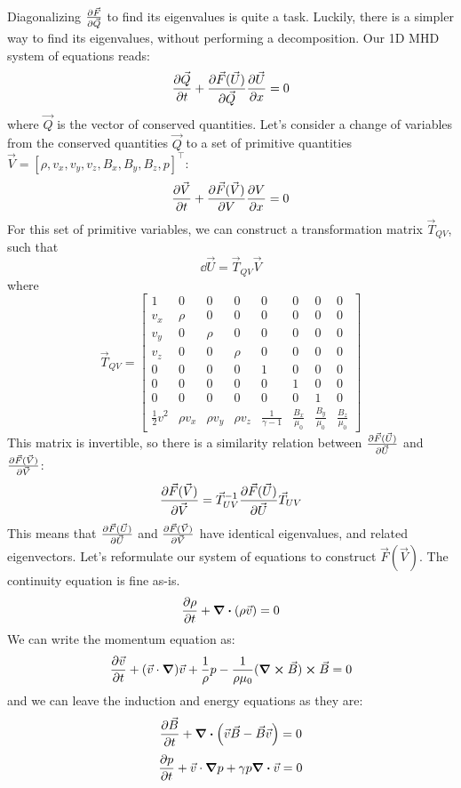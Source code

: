 \documentclass[10pt,letterpaper,notitlepage]{report}
\begin{document}
Diagonalizing $\pdv{\vec F}{\vec Q}$ to find its eigenvalues is quite a task. Luckily, there is a simpler way to find its eigenvalues, without performing a decomposition. Our 1D MHD system of equations reads:
\begin{equation}
\pdv{\vec Q}{t} + \pdv{\vec F(\vec U)}{\vec Q} \pdv{\vec U}{x} = 0
\end{equation}
where $\vec Q$ is the vector of conserved quantities. Let's consider a change of variables from the conserved quantities $\vec Q$ to a set of primitive quantities $\vec V = [\rho, v_x, v_y, v_z, B_x, B_y, B_z, p]^\top$:
\begin{equation}
\pdv{\vec V}{t} + \pdv{ \vec F(\vec V)}{V} \pdv{V}{x} = 0
\end{equation}
For this set of primitive variables, we can construct a transformation matrix $\vec T_{QV}$, such that
\begin{equation}
\dd \vec U = \vec T_{QV} \vec V
\end{equation}
where
\begin{equation}
\vec T_{QV} = \begin{bmatrix}
1 & 0 & 0 & 0 & 0 & 0 & 0 & 0 \\
v_x & \rho & 0 & 0 & 0 & 0 & 0 & 0\\
v_y & 0 & \rho & 0 & 0 & 0 & 0 & 0\\
v_z & 0 & 0 & \rho & 0 & 0 & 0 & 0 \\
0 & 0 & 0 & 0 & 1 & 0 & 0 & 0\\
0 & 0 & 0 & 0 & 0 & 1 & 0 & 0 \\
0 & 0 & 0 & 0 & 0 & 0 & 1 & 0\\
\frac{1}{2} v^2 & \rho v_x & \rho v_y & \rho v_z & \frac{1}{\gamma - 1} & \frac{B_x}{\mu_0} & \frac{B_y}{\mu_0} & \frac{B_z}{\mu_0}
\end{bmatrix}
\end{equation}
This matrix is invertible, so there is a similarity relation between $\pdv{\vec F( \vec U)}{\vec U}$ and $\pdv{\vec F(\vec V)}{\vec V}$:
\begin{equation}
\pdv{\vec F(\vec V)}{\vec V} = \vec T_{UV} ^{-1} \pdv{ \vec F(\vec U)}{\vec U} \vec T_{UV}
\end{equation}
This means that $\pdv{\vec F( \vec U)}{\vec U}$ and $\pdv{\vec F(\vec V)}{\vec V}$ have identical eigenvalues, and related eigenvectors. Let's reformulate our system of equations to construct $\vec F(\vec V)$. The continuity equation is fine as-is. 
\begin{equation}
\pdv{\rho}{t} + \div (\rho \vec v) = 0
\end{equation}
We can write the momentum equation as:
\begin{equation}
\pdv{\vec v}{t} + (\vec v \cdot \grad) \vec v + \frac{1}{\rho} p - \frac{1}{\rho \mu_0} (\curl \vec B) \cross \vec B = 0
\end{equation}
and we can leave the induction and energy equations as they are:
\begin{equation}
\pdv{\vec B}{t} + \div \left( \vec v \vec B - \vec B \vec v \right) = 0
\end{equation}
\begin{equation}
\pdv{p}{t} + \vec v \cdot \grad p + \gamma p \div \vec v = 0
\end{equation}
\end{document}

